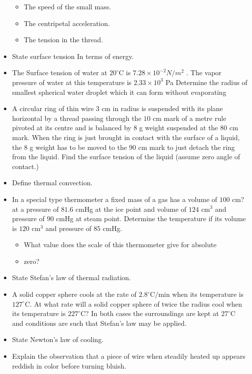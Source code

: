 \documentclass{article}
\begin{document}
\begin{itemize}
 \begin{itemize}
\item The speed of the small mass.
\item The centripetal acceleration. 
\item The tension in the thread. 
\end{itemize}
\item State surface tension In terms of energy. 
\item The Surface tension of water at $ 20^{\circ}$C is $ 7.28 \times 10^{-2}N/m^{2}$ . The vapor pressure of water at this temperature is $ 2.33 \times 10^{3}$ Pa Determine the radius of smallest spherical water droplet which it can form without evaporating
\item A circular ring of thin wire $ 3$ cm in radius is suspended with its plane horizontal by a thread passing through the $ 10$ cm mark of a metre rule pivoted at its centre and is balanced by $ 8$ g weight suspended at the $ 80$ cm mark. When the ring is just brought in contact with the surface of a liquid, the $ 8$ g weight has to be moved to the $ 90$ cm mark to just detach the ring from the liquid. Find the surface tension of the liquid (assume zero angle of contact.)
\item Define thermal convection.
\item In a special type thermometer a fixed mass of a gas has a volume of $ 100$ cm? at a pressure of $ 81.6$ cmHg at the ice point and volume of $ 124$ cm$ ^{3}$ and pressure of $ 90$ cmHg at steam point. Determine the temperature if its volume is $ 120$ cm$ ^{3}$ and pressure of $ 85$ cmHg.
 \begin{itemize}
\item What value does the scale of this thermometer give for absolute
\item zero? 
\end{itemize}
\item State Stefan’s law of thermal radiation.
\item A solid copper sphere cools at the rate of $ 2.8^{\circ}$C$/$min when its temperature is $ 127^{\circ}$C. At what rate will a solid copper sphere of twice the radius cool when its temperature is $ 227^{\circ}$C? In both cases the surroundings are kept at $ 27^{\circ}$C and conditions are such that  Stefan’s law may be applied.
\item State Newton’s law of cooling.
\item Explain the observation that a piece of wire when steadily heated up appears reddish in color before turning bluish. 

\end{itemize}
\end{document}
